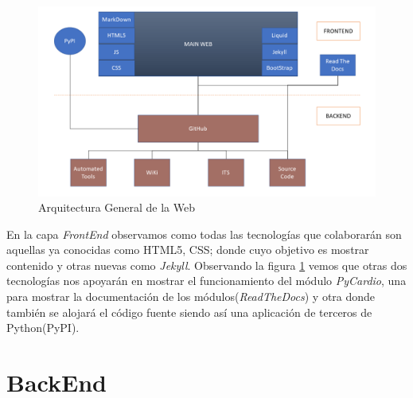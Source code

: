 \begin{figure}[h]
    \centering
    \includegraphics[width=\textwidth]{img/arqui_general.png}
    \caption{Arquitectura General de la Web}
    \label{fig:arquiGeneral}
\end{figure}
En la capa \emph{FrontEnd} observamos como todas las tecnologías que colaborarán son aquellas ya conocidas como HTML5, CSS; donde cuyo objetivo es mostrar contenido y otras nuevas como \emph{Jekyll}. Observando la figura \ref{fig:arquiGeneral} vemos que otras dos tecnologías nos apoyarán en mostrar el funcionamiento del módulo \emph{PyCardio}, una para mostrar la documentación de los módulos(\emph{ReadTheDocs}) y otra donde también se alojará el código fuente siendo así una aplicación de terceros de Python(PyPI).

\section{BackEnd}
\label{sec:backend}
